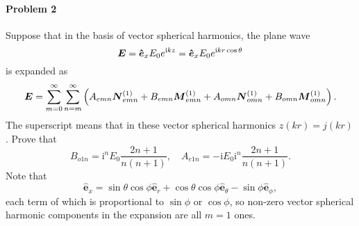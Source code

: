 \documentclass[hyperref, a4paper]{article}
\begin{document}
\paragraph{}

\paragraph{Problem 2} Suppose that in the basis of vector spherical harmonics, the plane wave 
\begin{equation}
    \boldsymbol{E}=\vu*{\boldsymbol{e}}_{x} E_{0} e^{\mathrm{i} k z}=\vu*{\boldsymbol{e}}_{x} E_{0} e^{\mathrm{i} k r \cos \theta}
    \label{eq:prob-2-4}
\end{equation}
is expanded as 
\begin{equation}
    \vb*{E} = \sum_{m = 0}^\infty \sum_{n = m}^\infty \left( A_{emn} \vb*{N}_{emn}^{(1)} + B_{emn} \vb*{M}_{emn}^{(1)} + A_{omn} \vb*{N}_{omn}^{(1)} + B_{omn} \vb*{M}_{omn}^{(1)} \right).
    \label{eq:prob-2-3}
\end{equation}
The superscript means that in these vector spherical harmonics $z(kr) = j(kr)$.
Prove that 
\begin{equation}
    B_{o 1 n}=\mathrm{i}^{n} E_{0} \frac{2 n+1}{n(n+1)}, \quad A_{e 1 n}=-\mathrm{i} E_{0} \mathrm{i}^{n} \frac{2 n+1}{n(n+1)}.
    \label{eq:prob-2-1}
\end{equation}
Note that 
\begin{equation}
    \hat{\boldsymbol{e}}_{x}=\sin \theta \cos \phi \hat{\boldsymbol{e}}_{r}+\cos \theta \cos \phi \hat{\boldsymbol{e}}_{\theta}-\sin \phi \hat{\boldsymbol{e}}_{\phi},
    \label{eq:prob-2-2}
\end{equation}
each term of which is proportional to $\sin\phi$ or $\cos\phi$, so non-zero vector spherical harmonic components in the expansion are all $m=1$ ones.
\end{document}
